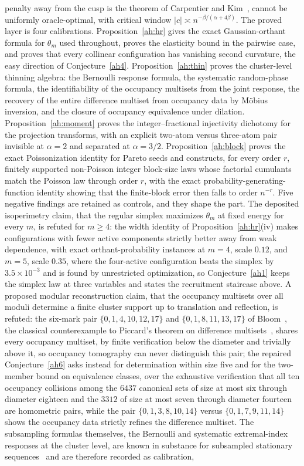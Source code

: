 \documentclass[11pt]{article}
\theoremstyle{definition}
\begin{document}
penalty away from the cusp is the theorem of Carpentier and Kim~\cite{CK15}, cannot be uniformly oracle-optimal, with critical window $|c|\asymp n^{-\beta/(\alpha+4\beta)}$.  The proved layer is four calibrations.  Proposition~\ref{ah:hr} gives the exact Gaussian-orthant formula for $\theta_m$ used throughout, proves the elasticity bound in the pairwise case, and proves that every collinear configuration has vanishing second curvature, the easy direction of Conjecture~\ref{ah4}.  Proposition~\ref{ah:thin} proves the cluster-level thinning algebra: the Bernoulli response formula, the systematic random-phase formula, the identifiability of the occupancy multisets from the joint response, the recovery of the entire difference multiset from occupancy data by M\"obius inversion, and the closure of occupancy equivalence under dilation.  Proposition~\ref{ah:moment} proves the integer--fractional injectivity dichotomy for the projection transforms, with an explicit two-atom versus three-atom pair invisible at $\alpha=2$ and separated at $\alpha=3/2$.  Proposition~\ref{ah:block} proves the exact Poissonization identity for Pareto seeds and constructs, for every order $r$, finitely supported non-Poisson integer block-size laws whose factorial cumulants match the Poisson law through order $r$, with the exact probability-generating-function identity showing that the finite-block error then falls to order $n^{-r}$.  Five negative findings are retained as controls, and they shape the part.  The deposited isoperimetry claim, that the regular simplex maximizes $\theta_m$ at fixed energy for every $m$, is refuted for $m\ge4$: the width identity of Proposition~\ref{ah:hr}(iv) makes configurations with fewer active components strictly better away from weak dependence, with exact orthant-probability instances at $m=4$, scale $0.12$, and $m=5$, scale $0.35$, where the four-active configuration beats the simplex by $3.5\times10^{-3}$ and is found by unrestricted optimization, so Conjecture~\ref{ah1} keeps the simplex law at three variables and states the recruitment staircase above.  A proposed modular reconstruction claim, that the occupancy multisets over all moduli determine a finite cluster support up to translation and reflection, is refuted: the six-mark pair $\{0,1,4,10,12,17\}$ and $\{0,1,8,11,13,17\}$ of Bloom~\cite{Blo77}, the classical counterexample to Piccard's theorem on difference multisets~\cite{Pat44,BG07}, shares every occupancy multiset, by finite verification below the diameter and trivially above it, so occupancy tomography can never distinguish this pair; the repaired Conjecture~\ref{ah6} asks instead for determination within size five and for the two-member bound on equivalence classes, over the exhaustive verification that all ten occupancy collisions among the $6437$ canonical sets of size at most six through diameter eighteen and the $3312$ of size at most seven through diameter fourteen are homometric pairs, while the pair $\{0,1,3,8,10,14\}$ versus $\{0,1,7,9,11,14\}$ shows the occupancy data strictly refines the difference multiset.  The subsampling formulas themselves, the Bernoulli and systematic extremal-index responses at the cluster level, are known in substance for subsampled stationary sequences~\cite{RT00,MF04,HS08} and are therefore recorded as calibration, 
\end{document}
